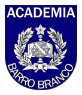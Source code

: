 \documentclass[	12pt, Times, openright, twoside, a4paper, english, brazil]{abntex2}
\begin{document}
\frenchspacing 


\begin{capa}
  \begin{center}
    {\ABNTEXchapterfont\bfseries\Large\MakeUppercase\imprimirinstituicao}
    \vspace*{\fill}\vspace*{\fill}
    
    \includegraphics[width=.25\textwidth]{logo-apmbb.png}
    \vspace*{\fill}
    
    {\ABNTEXchapterfont\large\imprimirautor}
    \vspace*{\fill}
    
    {\ABNTEXchapterfont\bfseries\Large\MakeUppercase\imprimirtitulo}
    \vspace*{\fill}\vspace*{\fill}
    
   \imprimirlocal
   \end{center}
\end{capa}

\imprimirfolhaderosto*
\end{document}
